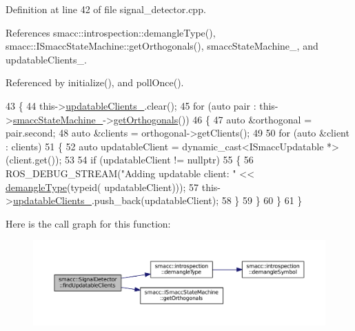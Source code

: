 Definition at line 42 of file signal\+\_\+detector.\+cpp.



References smacc\+::introspection\+::demangle\+Type(), smacc\+::\+I\+Smacc\+State\+Machine\+::get\+Orthogonals(), smacc\+State\+Machine\+\_\+, and updatable\+Clients\+\_\+.



Referenced by initialize(), and poll\+Once().


\begin{DoxyCode}
43 \{
44     this->\hyperlink{classsmacc_1_1SignalDetector_a01a457b4ec935473d6426efb7b87e683}{updatableClients\_}.clear();
45     \textcolor{keywordflow}{for} (\textcolor{keyword}{auto} pair : this->\hyperlink{classsmacc_1_1SignalDetector_a46025de6ac7b5980e22144f9703236a4}{smaccStateMachine\_}->\hyperlink{classsmacc_1_1ISmaccStateMachine_a5b4dcb0a5135296cf3d728721ecd8053}{getOrthogonals}())
46     \{
47         \textcolor{keyword}{auto} &orthogonal = pair.second;
48         \textcolor{keyword}{auto} &clients = orthogonal->getClients();
49 
50         \textcolor{keywordflow}{for} (\textcolor{keyword}{auto} &client : clients)
51         \{
52             \textcolor{keyword}{auto} updatableClient = \textcolor{keyword}{dynamic\_cast<}ISmaccUpdatable *\textcolor{keyword}{>}(client.get());
53 
54             \textcolor{keywordflow}{if} (updatableClient != \textcolor{keyword}{nullptr})
55             \{
56                 ROS\_DEBUG\_STREAM(\textcolor{stringliteral}{"Adding updatable client: "} << \hyperlink{namespacesmacc_1_1introspection_a670e39ccea29952859df4e2d0e45077b}{demangleType}(\textcolor{keyword}{typeid}(
      updatableClient)));
57                 this->\hyperlink{classsmacc_1_1SignalDetector_a01a457b4ec935473d6426efb7b87e683}{updatableClients\_}.push\_back(updatableClient);
58             \}
59         \}
60     \}
61 \}
\end{DoxyCode}


Here is the call graph for this function\+:
\nopagebreak
\begin{figure}[H]
\begin{center}
\leavevmode
\includegraphics[width=350pt]{classsmacc_1_1SignalDetector_a47ec2df560e2e33758ce3975bece9385_cgraph}
\end{center}
\end{figure}




